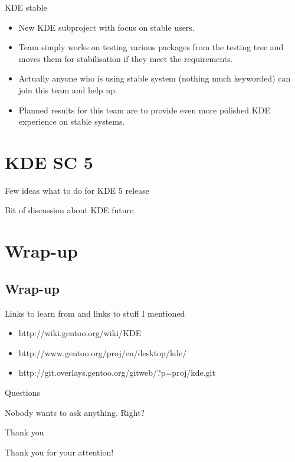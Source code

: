 \documentclass{beamer}
\begin{document}
\begin{frame}{KDE stable}
	\begin{itemize}
		\item New KDE subproject with focus on stable users.
		\item Team simply works on testing various packages from the testing tree and moves them for stabilisation if they meet the requirements.
		\item Actually anyone who is using stable system (nothing much keyworded) can join this team and help up.
		\item Planned results for this team are to provide even more polished KDE experience on stable systems.
	\end{itemize}
\end{frame}

\section{KDE SC 5}
\begin{frame}{Few ideas what to do for KDE 5 release}
	\begin{center}Bit of discussion about KDE future.\end{center}
\end{frame}

\section{Wrap-up}

\subsection{Wrap-up}

\begin{frame}{Links to learn from and links to stuff I mentioned}
	\begin{itemize}
		\item http://wiki.gentoo.org/wiki/KDE
		\item http://www.gentoo.org/proj/en/desktop/kde/
		\item http://git.overlays.gentoo.org/gitweb/?p=proj/kde.git
	\end{itemize}
\end{frame}

\begin{frame}{Questions}
	\begin{center}Nobody wants to ask anything. Right?\end{center}
\end{frame}

\begin{frame}{Thank you}
	\begin{center}Thank you for your attention!\end{center}
\end{frame}
\end{document}
